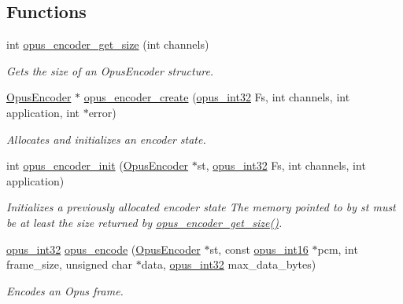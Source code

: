 \subsection*{Functions}
\begin{DoxyCompactItemize}
\item 
int \hyperlink{group__opus__encoder_gaefeb7dc1d6e3b59dea5ea674c86e9c18}{opus\+\_\+encoder\+\_\+get\+\_\+size} (int channels)
\begin{DoxyCompactList}\small\item\em Gets the size of an {\ttfamily Opus\+Encoder} structure. \end{DoxyCompactList}\item 
\hyperlink{group__opus__encoder_gaf461a3ef2f10c2fe8b994a176f06c9bd}{Opus\+Encoder} $\ast$ \hyperlink{group__opus__encoder_gaa89264fd93c9da70362a0c9b96b9ca88}{opus\+\_\+encoder\+\_\+create} (\hyperlink{opus__types_8h_aa4d309d6f80b99dbabebc8f98879ab9a}{opus\+\_\+int32} Fs, int channels, int application, int $\ast$error)
\begin{DoxyCompactList}\small\item\em Allocates and initializes an encoder state. \end{DoxyCompactList}\item 
int \hyperlink{group__opus__encoder_ga515db1c267a7421dacaad3610f79eb79}{opus\+\_\+encoder\+\_\+init} (\hyperlink{group__opus__encoder_gaf461a3ef2f10c2fe8b994a176f06c9bd}{Opus\+Encoder} $\ast$st, \hyperlink{opus__types_8h_aa4d309d6f80b99dbabebc8f98879ab9a}{opus\+\_\+int32} Fs, int channels, int application)
\begin{DoxyCompactList}\small\item\em Initializes a previously allocated encoder state The memory pointed to by st must be at least the size returned by \hyperlink{group__opus__encoder_gaefeb7dc1d6e3b59dea5ea674c86e9c18}{opus\+\_\+encoder\+\_\+get\+\_\+size()}. \end{DoxyCompactList}\item 
\hyperlink{opus__types_8h_aa4d309d6f80b99dbabebc8f98879ab9a}{opus\+\_\+int32} \hyperlink{group__opus__encoder_gad2d6bf6a9ffb6674879d7605ed073e25}{opus\+\_\+encode} (\hyperlink{group__opus__encoder_gaf461a3ef2f10c2fe8b994a176f06c9bd}{Opus\+Encoder} $\ast$st, const \hyperlink{opus__types_8h_acc9ed7cf60479eb81f9648c6ec27dc26}{opus\+\_\+int16} $\ast$pcm, int frame\+\_\+size, unsigned char $\ast$data, \hyperlink{opus__types_8h_aa4d309d6f80b99dbabebc8f98879ab9a}{opus\+\_\+int32} max\+\_\+data\+\_\+bytes)
\begin{DoxyCompactList}\small\item\em Encodes an Opus frame. \end{DoxyCompactList}\item 

\end{DoxyCompactItemize}
